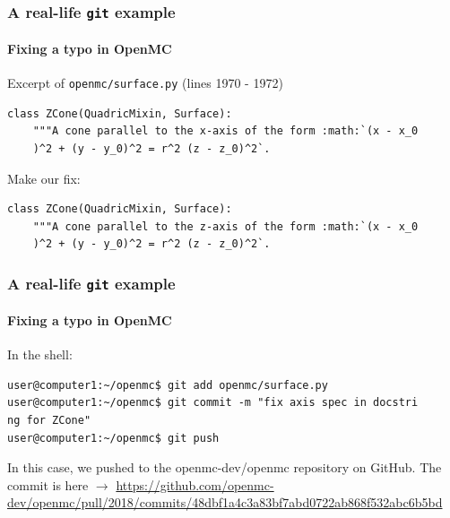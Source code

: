 \begin{frame}[fragile]
    \frametitle{A real-life \verb:git: example}
    \framesubtitle{Fixing a typo in OpenMC}

    Excerpt of \verb:openmc/surface.py: (lines 1970 - 1972)

    \begin{verbatim}
class ZCone(QuadricMixin, Surface):
    """A cone parallel to the x-axis of the form :math:`(x - x_0
    )^2 + (y - y_0)^2 = r^2 (z - z_0)^2`.
    \end{verbatim}
    Make our fix:
    
    \begin{verbatim}
class ZCone(QuadricMixin, Surface):
    """A cone parallel to the z-axis of the form :math:`(x - x_0
    )^2 + (y - y_0)^2 = r^2 (z - z_0)^2`.
    \end{verbatim}
\end{frame}

\begin{frame}[fragile]
    \frametitle{A real-life \verb:git: example}
    \framesubtitle{Fixing a typo in OpenMC}

    In the shell:
    \begin{verbatim}
user@computer1:~/openmc$ git add openmc/surface.py
user@computer1:~/openmc$ git commit -m "fix axis spec in docstri
ng for ZCone"
user@computer1:~/openmc$ git push
    \end{verbatim}

    In this case, we pushed to the openmc-dev/openmc repository on GitHub. The commit is here $\rightarrow$ \url{https://github.com/openmc-dev/openmc/pull/2018/commits/48dbf1a4c3a83bf7abd0722ab868f532abc6b5bd} 
\end{frame}
